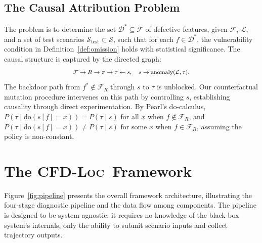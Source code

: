 \documentclass[journal]{IEEEtran}
\theoremstyle{plain}
\newcommand{\fwleq}[1]{\begin{equation}\medmath{#1}\end{equation}}
\newcommand{\methodname}{\textsc{CFD-Loc}}
\newcommand{\invlib}{\mathcal{L}}
\newcommand{\sys}{\mathcal{F}}
\begin{document}
\subsection{The Causal Attribution Problem}

The problem is to determine the set $\mathcal{D}^* \subseteq \mathcal{F}$ of defective features, given $\sys$, $\invlib$, and a set of test scenarios $\mathcal{S}_{\text{test}} \subset \mathcal{S}$, such that for each $f \in \mathcal{D}^*$, the vulnerability condition in Definition~\ref{def:omission} holds with statistical significance. The causal structure is captured by the directed graph:
\fwleq{\mathcal{F} \to R \to \pi \to \tau \leftarrow s, \quad s \to \text{anomaly}(\invlib, \tau).}
The backdoor path from $f^* \notin \mathcal{F}_R$ through $s$ to $\tau$ is unblocked. Our counterfactual mutation procedure intervenes on this path by controlling $s$, establishing causality through direct experimentation. By Pearl's do-calculus, $P(\tau \mid \text{do}(s[f] = x)) = P(\tau \mid s)$ for all $x$ when $f \notin \mathcal{F}_R$, and $P(\tau \mid \text{do}(s[f] = x)) \neq P(\tau \mid s)$ for some $x$ when $f \in \mathcal{F}_R$, assuming the policy is non-constant.

\section{The \methodname\ Framework}

Figure~\ref{fig:pipeline} presents the overall framework architecture, illustrating the four-stage diagnostic pipeline and the data flow among components. The pipeline is designed to be system-agnostic: it requires no knowledge of the black-box system's internals, only the ability to submit scenario inputs and collect trajectory outputs.
\end{document}
